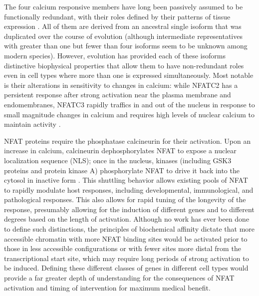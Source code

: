 The four calcium responsive members have long been passively assumed to be functionally redundant, with their roles defined by their patterns of tissue expression \citep{Klein2006, Mancini2009, Macian2005, Chow1999}. All of them are derived from an ancestral single isoform that was duplicated over the course of evolution (although intermediate representatives with greater than one but fewer than four isoforms seem to be unknown among modern species). However, evolution has provided each of these isoforms distinctive biophysical properties that allow them to have non-redundant roles even in cell types where more than one is expressed simultaneously. Most notable is their alterations in sensitivity to changes in calcium: while NFATC2 has a persistent response after strong activation near the plasma membrane and endomembranes, NFATC3 rapidly traffics in and out of the nucleus in response to small magnitude changes in calcium and requires high levels of nuclear calcium to maintain activity \citep{Yissachar2013, Kar2015, Kar2016}. 

NFAT proteins require the phosphatase calcineurin for their activation. Upon an increase in calcium, calcineurin dephosphorylates NFAT to expose a nuclear localization sequence (NLS); once in the nucleus, kinases (including GSK3 proteins and protein kinase A) phosphorylate NFAT to drive it back into the cytosol in inactive form \citep{Crabtree2002}. This shuttling behavior allows existing pools of NFAT to rapidly modulate host responses, including developmental, immunological, and pathological responses. This also allows for rapid tuning of the longevity of the response, presumably allowing for the induction of different genes and to different degrees based on the length of activation. Although no work has ever been done to define such distinctions, the principles of biochemical affinity dictate that more accessible chromatin with more NFAT binding sites would be activated prior to those in less accessible configurations or with fewer sites more distal from the transcriptional start site, which may require long periods of strong activation to be induced. Defining these different classes of genes in different cell types would provide a far greater depth of understanding for the consequences of NFAT activation and timing of intervention for maximum medical benefit.

